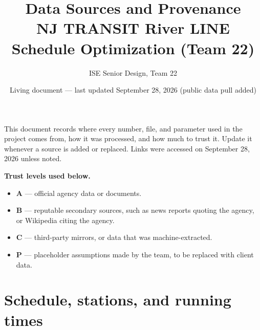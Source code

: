 \documentclass[11pt]{article}
\title{Data Sources and Provenance\\\large NJ TRANSIT River LINE Schedule Optimization (Team 22)}
\author{ISE Senior Design, Team 22}
\date{Living document --- last updated September 28, 2026 (public data pull added)}
\begin{document}
\maketitle

\noindent This document records where every number, file, and parameter used in the project comes from, how it was processed, and how much to trust it. Update it whenever a source is added or replaced. Links were accessed on September 28, 2026 unless noted.

\medskip
\noindent\textbf{Trust levels used below.}
\begin{itemize}
\item \textbf{A} --- official agency data or documents.
\item \textbf{B} --- reputable secondary sources, such as news reports quoting the agency, or Wikipedia citing the agency.
\item \textbf{C} --- third-party mirrors, or data that was machine-extracted.
\item \textbf{P} --- placeholder assumptions made by the team, to be replaced with client data.
\end{itemize}

\tableofcontents

\section{Schedule, stations, and running times}
\end{document}
